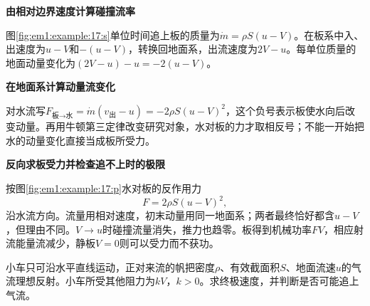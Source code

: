\begin{solution}\textbf{由相对边界速度计算碰撞流率}\par\nobreak
图\ref{fig:em1:example:17:s}单位时间追上板的质量为$\dot m=\rho S(u-V)$。在板系中入、出速度为$u-V$和$-(u-V)$，转换回地面系，出流速度为$2V-u$。每单位质量的地面动量变化为$(2V-u)-u=-2(u-V)$。



\par\medskip{}\noindent\textbf{在地面系计算动量流变化}\par\nobreak
对水流写$F_{\text{板}\to\text{水}}=\dot m(v_{\text{出}}-u)=-2\rho S(u-V)^2$，这个负号表示板使水向后改变动量。再用牛顿第三定律改变研究对象，水对板的力才取相反号；不能一开始把水的动量变化直接当成板所受力。



\par\medskip{}\noindent\textbf{反向求板受力并检查追不上时的极限}\par\nobreak
按图\ref{fig:em1:example:17:p}水对板的反作用力
\[\boxed{F=2\rho S(u-V)^2},\]
沿水流方向。流量用相对速度，初末动量用同一地面系；两者最终恰好都含$u-V$，但理由不同。$V\to u$时碰撞流量消失，推力也趋零。板得到机械功率$FV$，相应射流能量流减少，静板$V=0$则可以受力而不获功。\end{solution}
\begin{question}\begin{example}[有阻力的风帆小车]\label{em1:example:18}
小车只可沿水平直线运动，正对来流的帆把密度$\rho$、有效截面积$S$、地面流速$u$的气流理想反射。小车所受其他阻力为$kV$，$k>0$。求终极速度，并判断是否可能追上气流。
\end{example}
\end{question}
